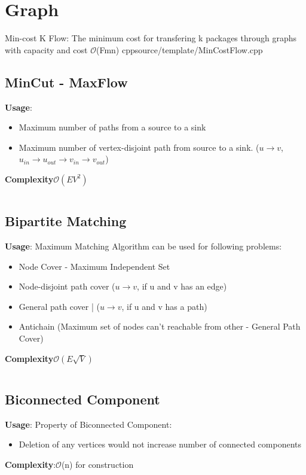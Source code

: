 \section{Graph}
{Min-cost K Flow: The minimum cost for transfering k packages through graphs with capacity and cost}
{$\mathcal{O}$(Fmn) }
{cpp}{source/template/MinCostFlow.cpp}


\subsection{MinCut - MaxFlow}
\textbf{Usage}:
\begin{itemize}
    \item Maximum number of paths from a source to a sink
    \item Maximum number of vertex-disjoint path from source to a sink. ($u \to v$, $u_{in} \to u_{out} \to v_{in} \to v_{out}$)
\end{itemize}
\textbf{Complexity}$\mathcal{O}(EV^2)$
\inputminted[]{cpp}{source/template/MaxFlow.cpp}


\subsection{Bipartite Matching}
\textbf{Usage}: Maximum Matching Algorithm can be used for following problems:
\begin{itemize}
\item Node Cover - Maximum Independent Set
\item Node-disjoint path cover ($u \to v$, if u and v has an edge)
\item General path cover |  ($u \to v$, if u and v has a path)
\item Antichain (Maximum set of nodes can't reachable from other - General Path Cover)
\end{itemize}
\textbf{Complexity}$\mathcal{O}(E\sqrt{V})$
\inputminted[]{cpp}{source/template/MaximumMatching.cpp}


\subsection{Biconnected Component}
{\textbf{Usage}: Property of Biconnected Component:
  \begin{itemize}
    \item Deletion of any vertices would not increase number of connected components
  \end{itemize}
}
{\textbf{Complexity}:$\mathcal{O}$(n) for construction}
\inputminted[]{cpp}{source/template/BCC.cpp}


